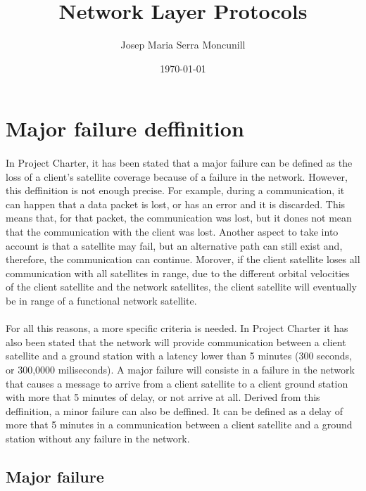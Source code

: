 \documentclass[12pt,a4paper]{report}
\author{Josep Maria Serra Moncunill}
\title{Network Layer Protocols}
\date{\today}
\begin{document}
\maketitle
\tableofcontents
\listoffigures
\listoftables

\section{Major failure deffinition}

\paragraph{}In Project Charter, it has been stated that a major failure can be defined as the loss of a client’s satellite coverage because of a failure in the network. However, this deffinition is not enough precise. For example, during a communication, it can happen that a data packet is lost, or has an error and it is discarded. This means that, for that packet, the communication was lost, but it dones not mean that the communication with the client was lost. Another aspect to take into account is that a satellite may fail, but an alternative path can still exist and, therefore, the communication can continue. Morover, if the client satellite loses all communication with all satellites in range, due to the different orbital velocities of the client satellite and the network satellites, the client satellite will eventually be in range of a functional network satellite.

\paragraph{}For all this reasons, a more specific criteria is needed. In Project Charter it has also been stated that the network will provide communication between a client satellite and a ground station with a latency lower than 5 minutes (300 seconds, or 300,0000 miliseconds). A major failure will consiste in a failure in the network that causes a message to arrive from a client satellite to a client ground station with more that 5 minutes of delay, or not arrive at all. Derived from this deffinition, a minor failure can also be deffined. It can be defined as a delay of more that 5 minutes in a communication between a client satellite and a ground station without any failure in the network.

\subsection{Major failure}
\end{document}
